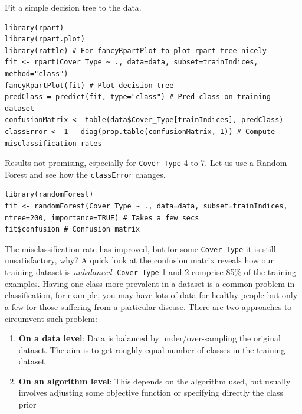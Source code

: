 \documentclass[a4paper,11pt]{article}
\begin{document}
Fit a simple decision tree to the data.
\\
\begin{lstlisting}[style=RCode]
library(rpart)
library(rpart.plot)
library(rattle) # For fancyRpartPlot to plot rpart tree nicely
fit <- rpart(Cover_Type ~ ., data=data, subset=trainIndices, method="class")
fancyRpartPlot(fit) # Plot decision tree
predClass = predict(fit, type="class") # Pred class on training dataset
confusionMatrix <- table(data$Cover_Type[trainIndices], predClass)
classError <- 1 - diag(prop.table(confusionMatrix, 1)) # Compute misclassification rates
\end{lstlisting}

Results not promising, especially for \texttt{Cover Type} 4 to 7. Let
us use a Random Forest and see how the \texttt{classError} changes. 
\\
\begin{lstlisting}[style=RCode]
library(randomForest)
fit <- randomForest(Cover_Type ~ ., data=data, subset=trainIndices, ntree=200, importance=TRUE) # Takes a few secs
fit$confusion # Confusion matrix
\end{lstlisting}

The misclassification rate has improved, but for some \texttt{Cover Type} it is still unsatisfactory,
why? A quick look at the confusion matrix reveals how our training dataset is \textit{unbalanced}. 
\texttt{Cover Type} 1 and 2 comprise 85\% of the training examples. Having one class more prevalent
in a dataset is a common problem in classification, for example, you may have lots of data
for healthy people but only a few for those suffering from a particular disease. There are two
approaches to circumvent such problem:

\begin{enumerate}
	\item \textbf{On a data level}: Data is balanced by under/over-sampling the original dataset. The aim is to get roughly
	equal number of classes in the training dataset
	\item \textbf{On an algorithm level}: This depends on the algorithm used, but usually involves adjusting some objective function 
	or specifying directly the class prior
\end{enumerate}
\end{document}
